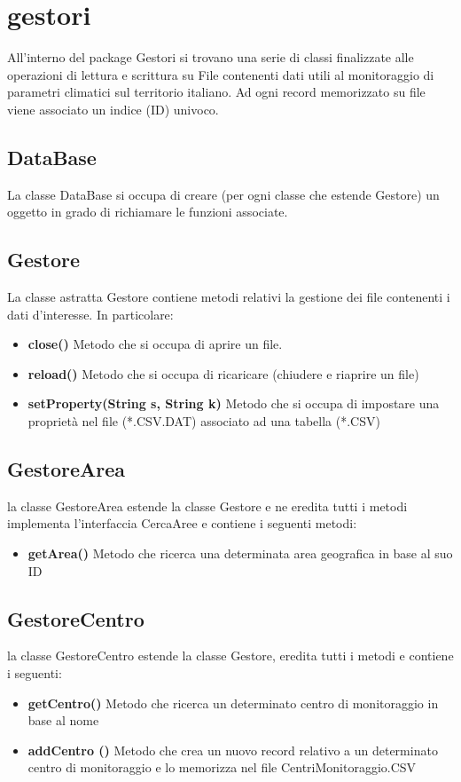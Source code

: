 \documentclass[a4paper, 12pt]{report}
\begin{document}
		\section{gestori}
		All'interno del package Gestori si trovano una serie di classi finalizzate alle operazioni di lettura e scrittura su File contenenti dati utili al monitoraggio di parametri climatici sul territorio italiano.
		Ad ogni record memorizzato su file viene associato un indice (ID) univoco.
			\subsection{DataBase}
			La classe DataBase si occupa di creare (per ogni classe che estende Gestore) un oggetto in grado di richiamare le funzioni associate.
			\subsection{Gestore}
			La classe astratta Gestore contiene metodi relativi la gestione dei file contenenti i dati d'interesse. In particolare:
			\begin{itemize}
				\item \textbf{close()}
				Metodo che si occupa di aprire un file.
				\item \textbf{reload()}
				Metodo che si occupa di ricaricare (chiudere e riaprire un file)
				\item  \textbf{setProperty(String s, String k)}
				Metodo che si occupa di impostare una proprietà nel file (*.CSV.DAT) associato ad una tabella (*.CSV)
			\end{itemize}

			\subsection{GestoreArea}
			la classe GestoreArea estende la classe Gestore e ne eredita tutti i metodi
			implementa l'interfaccia CercaAree e contiene i seguenti metodi:
			\begin{itemize}
				\item \textbf{getArea()}
				Metodo che ricerca una determinata area geografica in base al suo ID
			\end{itemize}

			\subsection{GestoreCentro}
			la classe GestoreCentro estende la classe Gestore, eredita tutti i metodi e contiene i seguenti:
			\begin{itemize}
				\item \textbf{getCentro()}
				Metodo che ricerca un determinato centro di monitoraggio in base al nome
				\item \textbf {addCentro ()}
				Metodo che crea un nuovo record relativo a un determinato centro di monitoraggio e lo memorizza nel file CentriMonitoraggio.CSV
			\end{itemize}
\end{document}
